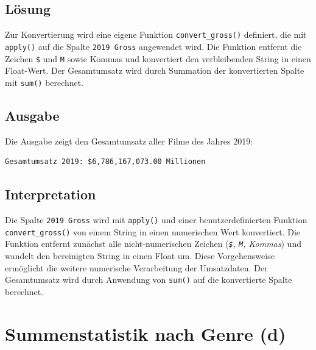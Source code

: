 \subsection{Lösung}

Zur Konvertierung wird eine eigene Funktion \texttt{convert\_gross()} definiert, die mit \texttt{apply()} auf die Spalte \texttt{2019 Gross} angewendet wird. Die Funktion entfernt die Zeichen \texttt{\$} und \texttt{M} sowie Kommas und konvertiert den verbleibenden String in einen Float-Wert. Der Gesamtumsatz wird durch Summation der konvertierten Spalte mit \texttt{sum()} berechnet.



\subsection{Ausgabe}

Die Ausgabe zeigt den Gesamtumsatz aller Filme des Jahres 2019:

\begin{verbatim}
Gesamtumsatz 2019: $6,786,167,073.00 Millionen
\end{verbatim}

\subsection{Interpretation}

Die Spalte \texttt{2019 Gross} wird mit \texttt{apply()} und einer benutzerdefinierten Funktion \texttt{convert\_gross()} von einem String in einen numerischen Wert konvertiert. Die Funktion entfernt zunächst alle nicht-numerischen Zeichen (\textit{\texttt{\$}, \texttt{M}, Kommas}) und wandelt den bereinigten String in einen Float um. Diese Vorgehensweise ermöglicht die weitere numerische Verarbeitung der Umsatzdaten. Der Gesamtumsatz wird durch Anwendung von \texttt{sum()} auf die konvertierte Spalte berechnet.

\cleardoublepage


\section{Summenstatistik nach Genre (d)}
\label{sec:1d}


